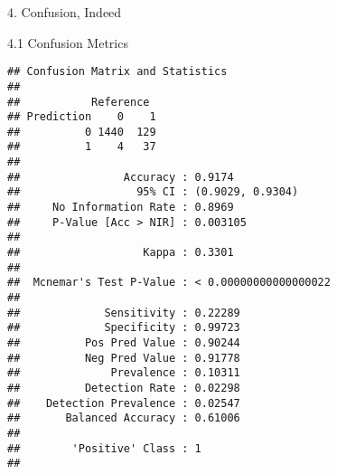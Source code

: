 \documentclass[
  ignorenonframetext,
]{beamer}
\newenvironment{Shaded}{\begin{snugshade}}{\end{snugshade}}
\newcommand{\AttributeTok}[1]{\textcolor[rgb]{0.77,0.63,0.00}{#1}}
\newcommand{\DecValTok}[1]{\textcolor[rgb]{0.00,0.00,0.81}{#1}}
\newcommand{\FunctionTok}[1]{\textcolor[rgb]{0.00,0.00,0.00}{#1}}
\newcommand{\NormalTok}[1]{#1}
\newcommand{\OtherTok}[1]{\textcolor[rgb]{0.56,0.35,0.01}{#1}}
\newcommand{\SpecialCharTok}[1]{\textcolor[rgb]{0.00,0.00,0.00}{#1}}
\newcommand{\StringTok}[1]{\textcolor[rgb]{0.31,0.60,0.02}{#1}}
\begin{document}
\begin{frame}[fragile]{4. Confusion, Indeed}
\begin{block}{4.1 Confusion Metrics}
\begin{verbatim}
## Confusion Matrix and Statistics
## 
##           Reference
## Prediction    0    1
##          0 1440  129
##          1    4   37
##                                                
##                Accuracy : 0.9174               
##                  95% CI : (0.9029, 0.9304)     
##     No Information Rate : 0.8969               
##     P-Value [Acc > NIR] : 0.003105             
##                                                
##                   Kappa : 0.3301               
##                                                
##  Mcnemar's Test P-Value : < 0.00000000000000022
##                                                
##             Sensitivity : 0.22289              
##             Specificity : 0.99723              
##          Pos Pred Value : 0.90244              
##          Neg Pred Value : 0.91778              
##              Prevalence : 0.10311              
##          Detection Rate : 0.02298              
##    Detection Prevalence : 0.02547              
##       Balanced Accuracy : 0.61006              
##                                                
##        'Positive' Class : 1                    
## 
\end{verbatim}

\begin{Shaded}
\end{Shaded}


\end{block}
\end{frame}
\end{document}
